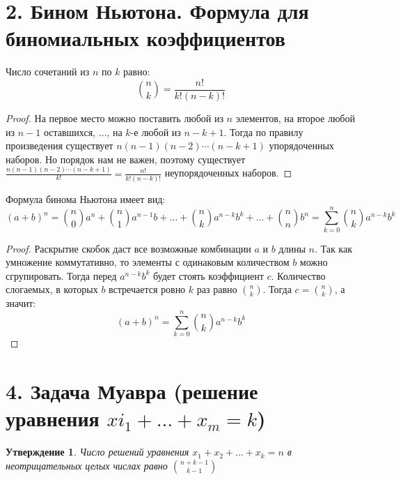 \documentclass[a4paper,12pt]{article}
\newtheorem*{Statements}{Утверждение}
\begin{document}
 	\section*{2. Бином Ньютона. Формула для биномиальных коэффициентов}
    Число сочетаний из $n$ по $k$ равно:
    \[
        \binom{n}{k} = \frac{n!}{k!(n - k)!}
    \]
    \begin{proof}
        На первое место можно поставить любой из $n$ элементов, на второе любой из $n - 1$ оставшихся, $\ldots$, на $k$-е любой из $n - k + 1$. Тогда по правилу произведения существует $n(n - 1)(n - 2)\cdots(n - k + 1)$ упорядоченных наборов. Но порядок нам не важен, поэтому существует $\displaystyle\frac{n(n - 1)(n - 2)\cdots(n - k + 1)}{k!} = \frac{n!}{k!(n - k)!}$ неупорядоченных наборов.
    \end{proof}
    Формула бинома Ньютона имеет вид:
    \[
        (a + b)^{n} = \binom{n}{0}a^{n} + \binom{n}{1}a^{n - 1}b + \ldots + \binom{n}{k}a^{n - k}b^{k} + \ldots + \binom{n}{n}b^{n} = \sum_{k = 0}^{n}\binom{n}{k}a^{n - k}b^{k}
    \]
    \begin{proof}
        Раскрытие скобок даст все возможные комбинации $a$ и $b$ длины $n$. Так как умножение коммутативно, то элементы с одинаковым количеством $b$ можно сгрупировать. Тогда перед $a^{n - k}b^{k}$ будет стоять коэффициент $c$. Количество слогаемых, в которых $b$ встречается ровно $k$ раз равно $\displaystyle\binom{n}{k}$. Тогда $c = \displaystyle\binom{n}{k}$, а значит:
        \[
            (a + b)^{n} = \sum_{k = 0}^{n}\binom{n}{k}a^{n - k}b^{k}
        \]
    \end{proof}
    

    \section*{4. Задача Муавра (решение уравнения $xi_1+\ldots+x_m=k$) }
    \begin{Statements}
    Число решений уравнения $x_1 + x_2 + \ldots + x_k = n$ в неотрицательных целых
    числах равно ${n+k-1 \choose k-1}$
    \end{Statements}

\end{document}
